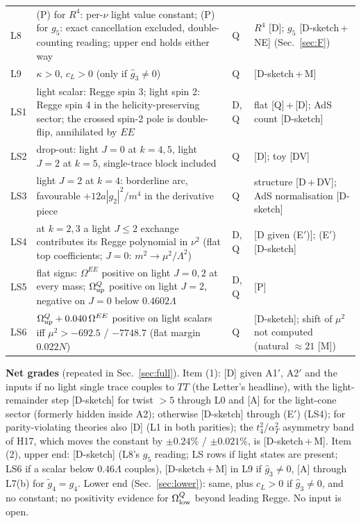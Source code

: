 \documentclass[aps,prl,onecolumn,superscriptaddress,nofootinbib]{revtex4-2}
\begin{document}
\begin{table}[!htbp]
\begin{ruledtabular}
\begin{tabular}{L{1.5cm}L{9.6cm}L{0.8cm}L{4.3cm}}
L8 & (P) for $R^4$: per-$\nu$ light value constant; (P) for $g_5$: exact cancellation excluded, double-counting reading; upper end holds either way & Q & $R^4$ [D]; $g_5$ [D-sketch\,+\,NE] (Sec.~\ref{sec:F})\\
L9 & $\kappa>0$, $c_L>0$ (only if $\hat g_3\ne0$) & Q & [D-sketch\,+\,M]\\
LS1 & light scalar: Regge spin 3; light spin 2: Regge spin 4 in the helicity-preserving sector; the crossed spin-2 pole is double-flip, annihilated by $EE$ & D, Q & flat [Q]\,+\,[D]; AdS count [D-sketch]\\
LS2 & drop-out: light $J=0$ at $k=4,5$, light $J=2$ at $k=5$, single-trace block included & Q & [D]; toy [DV]\\
LS3 & light $J=2$ at $k=4$: borderline arc, favourable $+12a|g_2|^2/m^4$ in the derivative piece & Q & structure [D\,+\,DV]; AdS normalisation [D-sketch]\\
LS4 & at $k=2,3$ a light $J\le2$ exchange contributes its Regge polynomial in $\nu^2$ (flat top coefficients; $J=0$: $m^2\to\mu^2/\Lambda^2$) & D, Q & [D given (E$'$)]; (E$'$) [D-sketch]\\
LS5 & flat signs: $\Omega^{EE}$ positive on light $J=0,2$ at every mass; $\Omega^Q_{\rm up}$ positive on light $J=2$, negative on $J=0$ below $0.4602\Lambda$ & D, Q & [P]\\
LS6 & $\Omega^Q_{\rm up}+0.040\,\Omega^{EE}$ positive on light scalars iff $\mu^2>-692.5$ / $-7748.7$ (flat margin $0.022N$) & Q & [D-sketch]; shift of $\mu^2$ not computed (natural $\approx21$ [M])\\
\end{tabular}
\end{ruledtabular}
\end{table}

\textbf{Net grades} (repeated in Sec.~\ref{sec:full}). Item (1): [D] given A1$'$, A2$'$ and the inputs if no light single trace couples to $TT$ (the Letter's headline), with the light-remainder step [D-sketch] for twist $>5$ through L0 and [A] for the light-cone sector (formerly hidden inside A2);
otherwise [D-sketch] through (E$'$) (LS4); for parity-violating theories also [D] (L1 in both parities); the $t_4^2$/$\alpha_T^2$ asymmetry band of H17, which moves the constant by $\pm0.24\%$ / $\pm0.021\%$, is
[D-sketch\,+\,M]. Item (2), upper end: [D-sketch] (L8's $g_5$ reading; LS rows if light states are present;
LS6 if a scalar below $0.46\Lambda$ couples), [D-sketch\,+\,M] in L9 if $\hat g_3\ne0$, [A] through L7(b) for
$\tilde g_4=g_4$. Lower end (Sec.~\ref{sec:lower}): same, plus $c_L>0$ if $\hat g_3\ne0$, and no constant; no positivity evidence for
$\Omega^Q_{\rm low}$ beyond leading Regge. No input is open.
\end{document}
